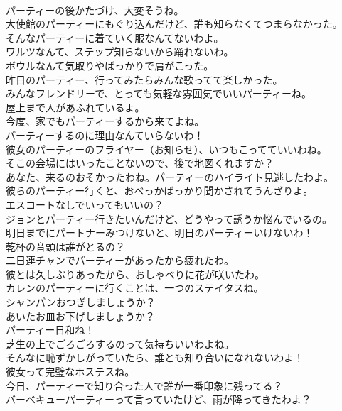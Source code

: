 \documentclass[8pt]{extreport}
\begin{document}
\begin{CJK}{UTF8}{min}
\\	パーティーの後かたづけ、大変そうね。	
\\	大使館のパーティーにもぐり込んだけど、誰も知らなくてつまらなかった。	
\\	そんなパーティーに着ていく服なんてないわよ。	
\\	ワルツなんて、ステップ知らないから踊れないわ。	
\\	ボウルなんて気取りやばっかりで肩がこった。	
\\	昨日のパーティー、行ってみたらみんな歌ってて楽しかった。	
\\	みんなフレンドリーで、とっても気軽な雰囲気でいいパーティーね。	
\\	屋上まで人があふれているよ。	
\\	今度、家でもパーティーするから来てよね。	
\\	パーティーするのに理由なんていらないわ！	
\\	彼女のパーティーのフライヤー（お知らせ）、いつもこってていいわね。	
\\	そこの会場にはいったことないので、後で地図くれますか？	
\\	あなた、来るのおそかったわね。パーティーのハイライト見逃したわよ。	
\\	彼らのパーティー行くと、おべっかばっかり聞かされてうんざりよ。	
\\	エスコートなしでいってもいいの？	
\\	ジョンとパーティー行きたいんだけど、どうやって誘うか悩んでいるの。	
\\	明日までにパートナーみつけないと、明日のパーティーいけないわ！	
\\	乾杯の音頭は誰がとるの？	
\\	二日連チャンでパーティーがあったから疲れたわ。	
\\	彼とは久しぶりあったから、おしゃべりに花が咲いたわ。
\\	カレンのパーティーに行くことは、一つのステイタスね。	
\\	シャンパンおつぎしましょうか？	
\\	あいたお皿お下げしましょうか？	
\\	パーティー日和ね！	
\\	芝生の上でごろごろするのって気持ちいいわよね。	
\\	そんなに恥ずかしがっていたら、誰とも知り合いになれないわよ！	
\\	彼女って完璧なホステスね。	
\\	今日、パーティーで知り合った人で誰が一番印象に残ってる？	
\\	バーベキューパーティーって言っていたけど、雨が降ってきたわよ？	

\end{CJK}
\end{document}
